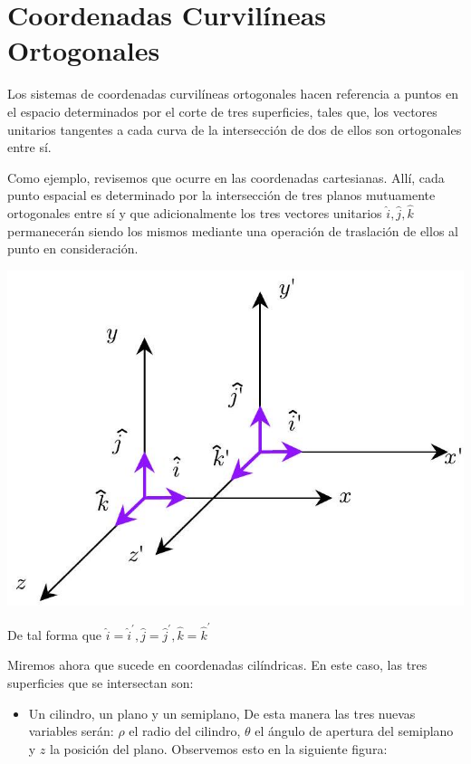 \chapter{Coordenadas Curvilíneas Ortogonales}


Los sistemas de coordenadas curvilíneas ortogonales hacen referencia a puntos en el espacio determinados por el corte de tres superficies, tales que, los vectores unitarios tangentes a cada curva de la intersección de dos de ellos son ortogonales entre sí.

Como ejemplo, revisemos que ocurre en las coordenadas cartesianas. Allí, cada punto espacial es determinado por la intersección de tres planos mutuamente ortogonales entre sí y que adicionalmente los tres vectores unitarios $\hat{i}, \hat{j}, \hat{k}$ permanecerán siendo los mismos mediante una operación de traslación de ellos al punto en consideración.

\begin{center}
  \includegraphics[max width=\textwidth]{sistemas_coordenados.jpg}
\end{center}

De tal forma que $\hat{i}=\hat{i}^{\prime}, \hat{j}=\hat{j}^{\prime}, \hat{k}=\hat{k}^{\prime}$

Miremos ahora que sucede en coordenadas cilíndricas. En este caso, las tres superficies que se intersectan son:

\begin{itemize}
  \item Un cilindro, un plano y un semiplano, De esta manera las tres nuevas variables serán: $\rho$ el radio del cilindro, $\theta$ el ángulo de apertura del semiplano y $z$ la posición del plano. Observemos esto en la siguiente figura:
\end{itemize}

